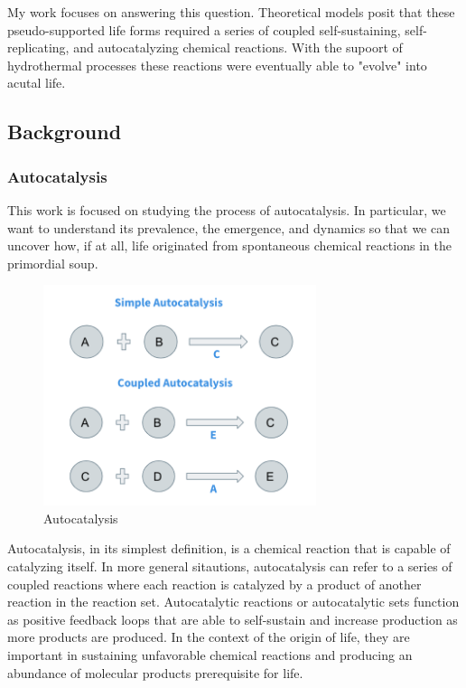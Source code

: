 \documentclass[11pt]{article}
\begin{document}
My work focuses on answering this question. Theoretical models posit that these pseudo-supported life forms required a series of coupled self-sustaining, self-replicating, and autocatalyzing chemical reactions.
With the supoort of hydrothermal processes these reactions were eventually able to "evolve" into acutal life. 



\subsection{Background}

\subsubsection{Autocatalysis}
This work is focused on studying the process of autocatalysis. In particular, we want to understand its prevalence, the emergence, and dynamics so that we can uncover how, if at all, life originated from spontaneous chemical reactions in the primordial soup.

\begin{figure}[H]
    \centering
\includegraphics[width=8cm]{autocatalysis}
\caption{Autocatalysis}

\end{figure}

Autocatalysis, in its simplest definition, is a chemical reaction that is capable of catalyzing itself. 
In more general sitautions, autocatalysis can refer to a series of coupled reactions where each reaction is catalyzed by a product of another reaction in the reaction set. 
Autocatalytic reactions or autocatalytic sets function as positive feedback loops that are able to self-sustain and increase production as more products are produced. 
In the context of the origin of life, they are important in sustaining unfavorable chemical reactions and producing an abundance of molecular products prerequisite for life.
\end{document}
